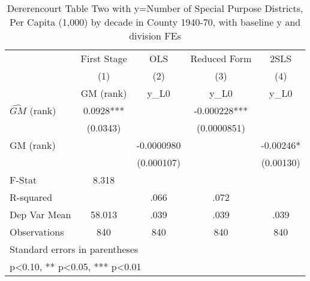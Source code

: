 \begin{table}[htbp]\centering
\def\sym#1{\ifmmode^{#1}\else\(^{#1}\)\fi}
\caption{Dererencourt Table Two with y=Number of Special Purpose Districts, Per Capita (1,000) by decade in County 1940-70, with baseline y and division FEs}
\begin{tabular}{l*{4}{c}}
\toprule
                    & First Stage   &         OLS   &Reduced Form   &        2SLS   \\
                    &\multicolumn{1}{c}{(1)}&\multicolumn{1}{c}{(2)}&\multicolumn{1}{c}{(3)}&\multicolumn{1}{c}{(4)}\\
                    &\multicolumn{1}{c}{GM  (rank)}&\multicolumn{1}{c}{y\_L0}&\multicolumn{1}{c}{y\_L0}&\multicolumn{1}{c}{y\_L0}\\
\midrule
$\hat{GM}$ (rank)   &      0.0928***&               &   -0.000228***&               \\
                    &    (0.0343)   &               & (0.0000851)   &               \\
\addlinespace
GM  (rank)          &               &  -0.0000980   &               &    -0.00246*  \\
                    &               &  (0.000107)   &               &   (0.00130)   \\
\midrule
F-Stat              &       8.318   &               &               &               \\
R-squared           &               &        .066   &        .072   &               \\
Dep Var Mean        &      58.013   &        .039   &        .039   &        .039   \\
Observations        &         840   &         840   &         840   &         840   \\
\bottomrule
\multicolumn{5}{l}{\footnotesize Standard errors in parentheses}\\
\multicolumn{5}{l}{\footnotesize * p<0.10, ** p<0.05, *** p<0.01}\\
\end{tabular}
\end{table}
